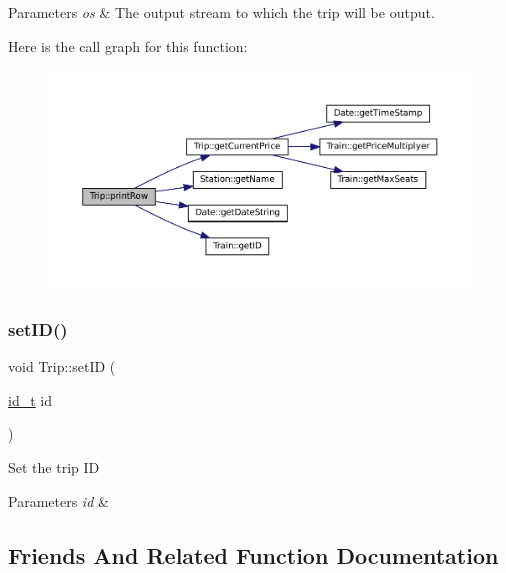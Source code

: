 \begin{DoxyParams}{Parameters}
{\em os} & The output stream to which the trip will be output. \\
\hline
\end{DoxyParams}
Here is the call graph for this function\+:
\nopagebreak
\begin{figure}[H]
\begin{center}
\leavevmode
\includegraphics[width=350pt]{classTrip_a233bab5c803f51ee5e79c611a15699c0_cgraph}
\end{center}
\end{figure}
\mbox{\label{classTrip_a15be60d61cf9fb7dc3e18e6cebedb27e}} 
\subsubsection{\texorpdfstring{set\+I\+D()}{setID()}}
{\footnotesize\ttfamily void Trip\+::set\+ID (\begin{DoxyParamCaption}\item[{\mbox{\hyperlink{project__utils_8h_a8f3a969054ad2200720b96e7e23dd4e1}{id\+\_\+t}}}]{id }\end{DoxyParamCaption})}

Set the trip ID


\begin{DoxyParams}{Parameters}
{\em id} & \\
\hline
\end{DoxyParams}


\subsection{Friends And Related Function Documentation}
\mbox{\label{classTrip_ad143ba29c1778aa25a53301503c3f2bd}} 
